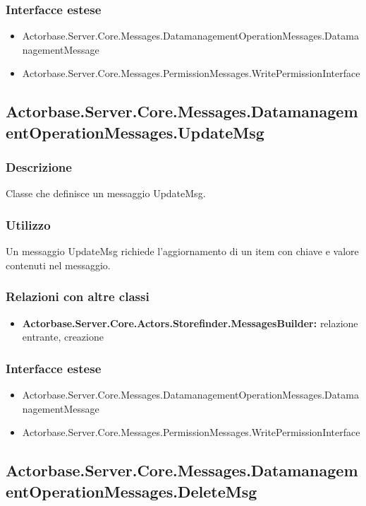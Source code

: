 \documentclass[a4paper]{article}
\begin{document}
			\subsubsection{Interfacce estese}
			\begin{itemize}
				\item Actorbase.Server.Core.Messages.DatamanagementOperationMessages.DatamanagementMessage
				\item Actorbase.Server.Core.Messages.PermissionMessages.WritePermissionInterface
			\end{itemize}

			\subsection{Actorbase.Server.Core.Messages.DatamanagementOperationMessages.UpdateMsg}
			\subsubsection{Descrizione}
				Classe che definisce un messaggio UpdateMsg.
			\subsubsection{Utilizzo}
				Un messaggio UpdateMsg richiede l'aggiornamento di un item con chiave e valore contenuti nel messaggio.
			\subsubsection{Relazioni con altre classi}
			\begin{itemize}
				\item \textbf{Actorbase.Server.Core.Actors.Storefinder.MessagesBuilder:} relazione entrante, creazione
			\end{itemize}
			\subsubsection{Interfacce estese}
			\begin{itemize}
				\item Actorbase.Server.Core.Messages.DatamanagementOperationMessages.DatamanagementMessage
				\item Actorbase.Server.Core.Messages.PermissionMessages.WritePermissionInterface
			\end{itemize}

			\subsection{Actorbase.Server.Core.Messages.DatamanagementOperationMessages.DeleteMsg}
\end{document}
